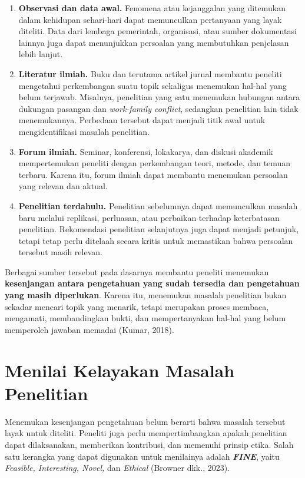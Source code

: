 \documentclass[
  indonesian,
  letterpaper,
  DIV=11,
  numbers=noendperiod]{scrreprt}
\providecommand{\tightlist}{%
  \setlength{\itemsep}{0pt}\setlength{\parskip}{0pt}}
\begin{document}
\begin{enumerate}
\def\labelenumi{\arabic{enumi}.}
\tightlist
\item
  \textbf{Observasi dan data awal.} Fenomena atau kejanggalan yang
  ditemukan dalam kehidupan sehari-hari dapat memunculkan pertanyaan
  yang layak diteliti. Data dari lembaga pemerintah, organisasi, atau
  sumber dokumentasi lainnya juga dapat menunjukkan persoalan yang
  membutuhkan penjelasan lebih lanjut.
\item
  \textbf{Literatur ilmiah.} Buku dan terutama artikel jurnal membantu
  peneliti mengetahui perkembangan suatu topik sekaligus menemukan
  hal-hal yang belum terjawab. Misalnya, penelitian yang satu menemukan
  hubungan antara dukungan pasangan dan \emph{work-family conflict},
  sedangkan penelitian lain tidak menemukannya. Perbedaan tersebut dapat
  menjadi titik awal untuk mengidentifikasi masalah penelitian.
\item
  \textbf{Forum ilmiah.} Seminar, konferensi, lokakarya, dan diskusi
  akademik mempertemukan peneliti dengan perkembangan teori, metode, dan
  temuan terbaru. Karena itu, forum ilmiah dapat membantu menemukan
  persoalan yang relevan dan aktual.
\item
  \textbf{Penelitian terdahulu.} Penelitian sebelumnya dapat memunculkan
  masalah baru melalui replikasi, perluasan, atau perbaikan terhadap
  keterbatasan penelitian. Rekomendasi penelitian selanjutnya juga dapat
  menjadi petunjuk, tetapi tetap perlu ditelaah secara kritis untuk
  memastikan bahwa persoalan tersebut masih relevan.
\end{enumerate}

Berbagai sumber tersebut pada dasarnya membantu peneliti menemukan
\textbf{kesenjangan antara pengetahuan yang sudah tersedia dan
pengetahuan yang masih diperlukan}. Karena itu, menemukan masalah
penelitian bukan sekadar mencari topik yang menarik, tetapi merupakan
proses membaca, mengamati, membandingkan bukti, dan mempertanyakan
hal-hal yang belum memperoleh jawaban memadai (Kumar, 2018).

\section{Menilai Kelayakan Masalah
Penelitian}\label{menilai-kelayakan-masalah-penelitian}

Menemukan kesenjangan pengetahuan belum berarti bahwa masalah tersebut
layak untuk diteliti. Peneliti juga perlu mempertimbangkan apakah
penelitian dapat dilaksanakan, memberikan kontribusi, dan memenuhi
prinsip etika. Salah satu kerangka yang dapat digunakan untuk menilainya
adalah \textbf{\emph{FINE}}, yaitu \emph{Feasible, Interesting, Novel,}
dan \emph{Ethical} (Browner dkk., 2023).
\end{document}

